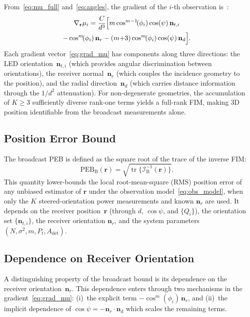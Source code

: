 \documentclass[conference]{IEEEtran}
\begin{document}
From~\eqref{eq:mu_full} and~\eqref{eq:angles}, the gradient of the $i$-th observation is~\cite{AcunaTCOM2025}:
\begin{multline}
\nabla_{\mathbf{r}}\mu_i = \frac{C}{d^3}\Bigl[
  m\cos^{m-1}\!(\phi_i)\cos(\psi)\,\mathbf{n}_{t,i} \\
  - \cos^m\!(\phi_i)\,\mathbf{n}_r
  - (m{+}3)\cos^m\!(\phi_i)\cos(\psi)\,\mathbf{n}_d
\Bigr].
\label{eq:grad_mu}
\end{multline}
Each gradient vector~\eqref{eq:grad_mu} has components along three directions: the LED orientation~$\mathbf{n}_{t,i}$ (which provides angular discrimination between orientations), the receiver normal~$\mathbf{n}_r$ (which couples the incidence geometry to the position), and the radial direction~$\mathbf{n}_d$ (which carries distance information through the $1/d^2$ attenuation).
For non-degenerate geometries, the accumulation of $K\geq 3$ sufficiently diverse rank-one terms yields a full-rank FIM, making 3D position identifiable from the broadcast measurements alone.

\subsection{Position Error Bound}
\label{subsec:peb_def}

The broadcast PEB is defined as the square root of the trace of the inverse FIM:
\begin{equation}
\mathrm{PEB}_\mathrm{B}(\mathbf{r})
= \sqrt{\operatorname{tr}\!\bigl\{\mathcal{I}_{\mathrm{B}}^{-1}(\mathbf{r})\bigr\}}.
\label{eq:peb_b}
\end{equation}
This quantity lower-bounds the local root-mean-square (RMS) position error of any unbiased estimator of $\mathbf{r}$ under the observation model~\eqref{eq:obs_model}, when only the $K$ steered-orientation power measurements and known $\mathbf{n}_r$ are used.
It depends on the receiver position~$\mathbf{r}$ (through $d$, $\cos\psi$, and $\{Q_i\}$), the orientation set $\{\mathbf{n}_{t,i}\}$, the receiver orientation $\mathbf{n}_r$, and the system parameters $(N, \sigma^2, m, P_t, A_{\mathrm{det}})$.

\subsection{Dependence on Receiver Orientation}
\label{subsec:peb_nr_dep}

A distinguishing property of the broadcast bound is its dependence on the receiver orientation~$\mathbf{n}_r$.
This dependence enters through two mechanisms in the gradient~\eqref{eq:grad_mu}: (i)~the explicit term $-\cos^m(\phi_i)\,\mathbf{n}_r$, and (ii)~the implicit dependence of $\cos\psi = -\mathbf{n}_r\cdot\mathbf{n}_d$ which scales the remaining terms.
\end{document}
